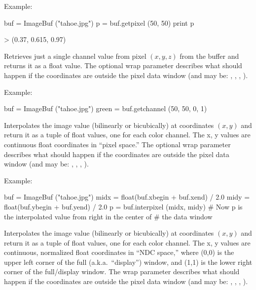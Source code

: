 \noindent Example:
\begin{code}
    buf = ImageBuf ("tahoe.jpg")
    p = buf.getpixel (50, 50)
    print p

    > (0.37, 0.615, 0.97)
\end{code}
\apiend

Retrieves just a single channel value from pixel $(x,y,z)$ from the buffer
and returns it as a {\cf float} value.  The optional {\cf wrap} parameter
describes what should happen if the coordinates are outside the pixel data
window (and may be: , , , ).

\noindent Example:
\begin{code}
    buf = ImageBuf ("tahoe.jpg")
    green = buf.getchannel (50, 50, 0, 1)
\end{code}
\apiend

Interpolates the image value (bilinearly or bicubically)
at coordinates $(x,y)$ and return it as a tuple
of {\cf float} values, one for each color channel.  The {\cf x, y} values
are continuous {\cf float} coordinates in ``pixel space.''   The optional
{\cf wrap} parameter describes what should happen if the coordinates are
outside the pixel data window (and may be: 
, , , ).

\noindent Example:
\begin{code}
    buf = ImageBuf ("tahoe.jpg")
    midx = float(buf.xbegin + buf.xend) / 2.0
    midy = float(buf.ybegin + buf.yend) / 2.0
    p = buf.interpixel (midx, midy)
    # Now p is the interpolated value from right in the center of
    # the data window
\end{code}
\apiend


Interpolates the image value (bilinearly or bicubically)
at coordinates $(x,y)$ and return it as a tuple
of {\cf float} values, one for each color channel.  The {\cf x, y} values
are continuous, normalized {\cf float} coordinates in ``NDC space,'' where
{\cf (0,0)} is the upper left corner of the full (a.k.a.\ ``display'')
window, and {\cf (1,1)} is the lower right corner of the full/display
window. The  {\cf wrap} parameter describes what should happen if the
coordinates are outside the pixel data window (and may be: 
, , , ).

